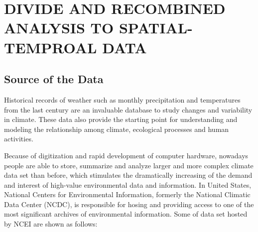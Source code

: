 \chapter[DIVIDE AND RECOMBINED ANALYSIS TO SPATIAL-TEMPROAL \\ DATA]{DIVIDE AND RECOMBINED ANALYSIS TO SPATIAL-TEMPROAL DATA}

\section{Source of the Data}

Historical records of weather such as monthly precipitation and temperatures from the last
century are an invaluable database to study changes and variability in climate. These data
also provide the starting point for understanding and modeling the relationship among climate,
ecological processes and human activities. 

Because of digitization and rapid development of computer hardware, nowadays
people are able to store, summarize and analyze larger and more 
complex climate data set than before, which stimulates the dramatically 
increasing  of the demand and interest of high-value environmental data and 
information. In United States, National Centers for Environmental Information, 
formerly the National Climatic Data Center (NCDC), is responsible for hosing and 
providing access to one of the most significant archives of environmental 
information. Some of data set hosted by NCEI \cite{NCEI} are shown as follows:

